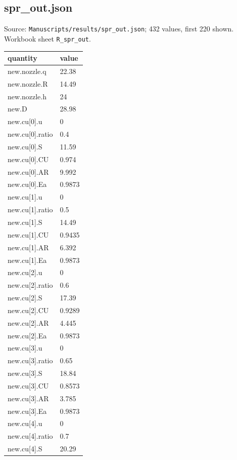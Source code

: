 \subsection*{spr\_out.json}
\noindent\small Source: \nolinkurl{Manuscripts/results/spr_out.json}; 432 values, first 220 shown. Workbook sheet \texttt{R\_spr\_out}.\par
{\scriptsize\begin{longtable}{p{}p{}}\toprule\textbf{quantity} & \textbf{value}\\\midrule\endhead
{}new.nozzle.q & 22.38\\
{}new.nozzle.R & 14.49\\
{}new.nozzle.h & 24\\
{}new.D & 28.98\\
{}new.cu[0].u & 0\\
{}new.cu[0].ratio & 0.4\\
{}new.cu[0].S & 11.59\\
{}new.cu[0].CU & 0.974\\
{}new.cu[0].AR & 9.992\\
{}new.cu[0].Ea & 0.9873\\
{}new.cu[1].u & 0\\
{}new.cu[1].ratio & 0.5\\
{}new.cu[1].S & 14.49\\
{}new.cu[1].CU & 0.9435\\
{}new.cu[1].AR & 6.392\\
{}new.cu[1].Ea & 0.9873\\
{}new.cu[2].u & 0\\
{}new.cu[2].ratio & 0.6\\
{}new.cu[2].S & 17.39\\
{}new.cu[2].CU & 0.9289\\
{}new.cu[2].AR & 4.445\\
{}new.cu[2].Ea & 0.9873\\
{}new.cu[3].u & 0\\
{}new.cu[3].ratio & 0.65\\
{}new.cu[3].S & 18.84\\
{}new.cu[3].CU & 0.8573\\
{}new.cu[3].AR & 3.785\\
{}new.cu[3].Ea & 0.9873\\
{}new.cu[4].u & 0\\
{}new.cu[4].ratio & 0.7\\
{}new.cu[4].S & 20.29\\

\end{longtable}}
